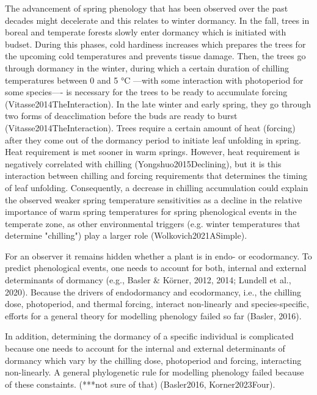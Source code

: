 \documentclass{article}
\begin{document}
The advancement of spring phenology that has been observed over the past decades might decelerate and this relates to winter dormancy. In the fall, trees in boreal and temperate forests slowly enter dormancy which is initiated with budset. During this phases, cold hardiness increases which prepares the trees for the upcoming cold temperatures and prevents tissue damage. Then, the trees go through dormancy in the winter, during which a certain duration of chilling temperatures between 0 and 5 °C ---with some interaction with photoperiod for some species---- is necessary for the trees to be ready to accumulate forcing (Vitasse2014TheInteraction). In the late winter and early spring, they go through two forms of deacclimation before the buds are ready to burst (Vitasse2014TheInteraction). Trees require a certain amount of heat (forcing) after they come out of the dormancy period to initiate leaf unfolding in spring. Heat requirement is met sooner in warm springs. However, heat requirement is negatively correlated with chilling (Yongshuo2015Declining), but it is this interaction between chilling and forcing requirements that determines the timing of leaf unfolding. Consequently, a decrease in chilling accumulation could explain the observed weaker spring temperature sensitivities as a decline in the relative importance of warm spring temperatures for spring phenological events in the temperate zone, as other environmental triggers (e.g. winter temperatures that determine "chilling") play a larger role (Wolkovich2021ASimple). 


For an observer it remains hidden whether a plant is in endo- or ecodormancy. To predict phenological events, one needs to account for both, internal and external determinants of dormancy (e.g., Basler \& Körner, 2012, 2014; Lundell et al., 2020). Because the drivers of endodormancy and ecodormancy, i.e., the chilling dose, photoperiod, and thermal forcing, interact non-linearly and species-specific, efforts for a general theory for modelling phenology failed so far (Basler, 2016).

In addition, determining the dormancy of a specific individual is complicated because one needs to account for the internal and external determinants of dormancy which vary by the chilling dose, photoperiod and forcing, interacting non-linearly. A general phylogenetic rule for modelling phenology failed because of these constaints. (***not sure of that) (Basler2016, Korner2023Four).
\end{document}
